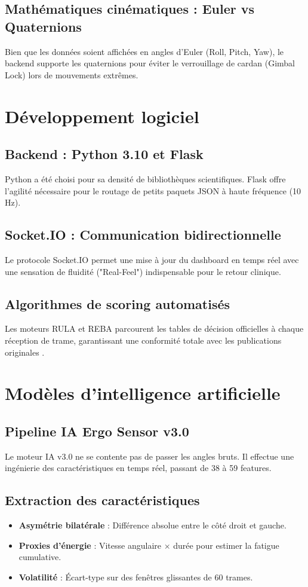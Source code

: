 \documentclass[12pt,a4paper]{report}
\begin{document}
\section{Mathématiques cinématiques : Euler vs Quaternions}
Bien que les données soient affichées en angles d'Euler (Roll, Pitch, Yaw), le backend supporte les quaternions pour éviter le verrouillage de cardan (Gimbal Lock) lors de mouvements extrêmes.

\chapter{Développement logiciel}
\section{Backend : Python 3.10 et Flask}
Python a été choisi pour sa densité de bibliothèques scientifiques. Flask offre l'agilité nécessaire pour le routage de petits paquets JSON à haute fréquence (10 Hz).

\section{Socket.IO : Communication bidirectionnelle}
Le protocole Socket.IO permet une mise à jour du dashboard en temps réel avec une sensation de fluidité ("Real-Feel") indispensable pour le retour clinique.

\section{Algorithmes de scoring automatisés}
Les moteurs RULA et REBA parcourent les tables de décision officielles à chaque réception de trame, garantissant une conformité totale avec les publications originales \cite{mcatamney1993rula}.

\chapter{Modèles d'intelligence artificielle}
\section{Pipeline IA Ergo Sensor v3.0}
Le moteur IA v3.0 ne se contente pas de passer les angles bruts. Il effectue une ingénierie des caractéristiques en temps réel, passant de 38 à 59 features.

\section{Extraction des caractéristiques}
\begin{itemize}
    \item \textbf{Asymétrie bilatérale} : Différence absolue entre le côté droit et gauche.
    \item \textbf{Proxies d'énergie} : Vitesse angulaire $\times$ durée pour estimer la fatigue cumulative.
    \item \textbf{Volatilité} : Écart-type sur des fenêtres glissantes de 60 trames.
\end{itemize}
\end{document}
